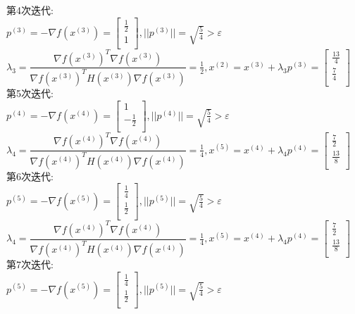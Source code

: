 \begin{solution}
第4次迭代:\\
$p^{(3)}=-\nabla f(x^{(3)})=\begin{bmatrix} \frac{1}{2}\\1\\\end{bmatrix},||p^{(3)}||=\sqrt{\frac{5}{4}}>\varepsilon$\\
$\lambda_3=\dfrac{\nabla f(x^{(3)})^T\nabla f(x^{(3)})}{\nabla f(x^{(3)})^TH(x^{(3)})\nabla f(x^{(3)})}=\frac{1}{2},x^{(2)}=x^{(3)}+\lambda_3p^{(3)}=\begin{bmatrix} \frac{13}{4}\\\frac{7}{4}\\\end{bmatrix}$\\
第5次迭代:\\
$p^{(4)}=-\nabla f(x^{(4)})=\begin{bmatrix} 1\\-\frac{1}{2}\\\end{bmatrix},||p^{(4)}||=\sqrt{\frac{5}{4}}>\varepsilon$\\
$\lambda_4=\dfrac{\nabla f(x^{(4)})^T\nabla f(x^{(4)})}{\nabla f(x^{(4)})^TH(x^{(4)})\nabla f(x^{(4)})}=\frac{1}{4},x^{(5)}=x^{(4)}+\lambda_4p^{(4)}=\begin{bmatrix} \frac{7}{2}\\\frac{13}{8}\\\end{bmatrix}$\\
第6次迭代:\\
$p^{(5)}=-\nabla f(x^{(5)})=\begin{bmatrix} \frac{1}{4}\\\frac{1}{2}\\\end{bmatrix},||p^{(5)}||=\sqrt{\frac{5}{4}}>\varepsilon$\\
$\lambda_4=\dfrac{\nabla f(x^{(4)})^T\nabla f(x^{(4)})}{\nabla f(x^{(4)})^TH(x^{(4)})\nabla f(x^{(4)})}=\frac{1}{4},x^{(5)}=x^{(4)}+\lambda_4p^{(4)}=\begin{bmatrix} \frac{7}{2}\\\frac{13}{8}\\\end{bmatrix}$\\
第7次迭代:\\
$p^{(5)}=-\nabla f(x^{(5)})=\begin{bmatrix} \frac{1}{4}\\\frac{1}{2}\\\end{bmatrix},||p^{(5)}||=\sqrt{\frac{5}{4}}>\varepsilon$\\

\end{solution}
